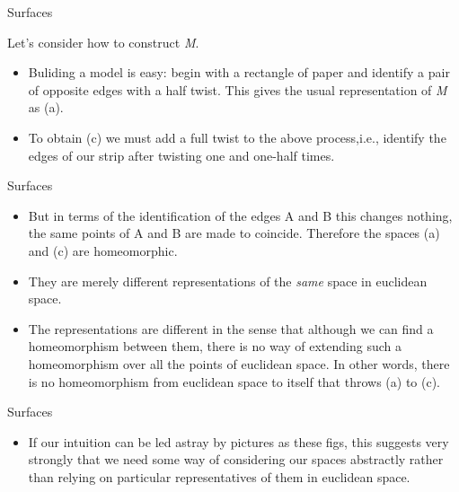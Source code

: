 \documentclass{beamer}
\begin{document}
\begin{frame}{Surfaces}
  \begin{block}{}
    Let's consider how to construct \textsl{M}.
    \begin{itemize}
    \item Buliding a model is easy: begin with a rectangle of paper and identify a pair of opposite edges with a half twist. This gives the usual representation of \textsl{M} as (a).
    \item To obtain (c) we must add a full twist to the above process,i.e., identify the edges of our strip after twisting one and one-half times.
    \end{itemize}
  \end{block}
\end{frame}

\begin{frame}{Surfaces}
  \begin{block}{}
    \begin{itemize}
    \item But in terms of the identification of the edges A and B this changes nothing, the same points of A and B are made to coincide. Therefore the spaces (a) and (c) are homeomorphic.
    \item They are merely different representations of the \textsl{same} space in euclidean space.
    \item The representations are different in the sense that although we can find a homeomorphism between them, there is no way of extending such a homeomorphism over all the points of euclidean space. In other words, there is no homeomorphism from euclidean space to itself that throws (a) to (c).
    \end{itemize}
  \end{block}
\end{frame}

\begin{frame}{Surfaces}
  \begin{block}{}
    \begin{itemize}
    \item If our intuition can be led astray by pictures as these figs, this suggests very strongly that we need some way of considering our spaces abstractly rather than relying on particular representatives of them in euclidean space.
    \end{itemize}
  \end{block}
\end{frame}
\end{document}

